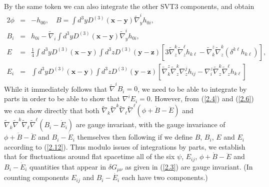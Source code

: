 By the same token we can also integrate the other SVT3 components, and obtain 
%
\begin{eqnarray}
2\phi&=&-h_{00},\quad
B=\int d^3yD^{(3)}(\mathbf{x}-\mathbf{y})\tilde{\nabla}_y^ih_{0i},
\nonumber\\
B_i&=&h_{0i}-\tilde{\nabla}_i\int d^3yD^{(3)}(\mathbf{x}-\mathbf{y})\tilde{\nabla}_y^ih_{0i},
\nonumber\\
E&=&\frac{1}{4}\int d^3yD^{(3)}(\mathbf{x}-\mathbf{y})\int d^3zD^{(3)}(\mathbf{y}-\mathbf{z})\left[3\tilde{\nabla}_z^k\tilde{\nabla}_z^{\ell}h_{k\ell}-\tilde{\nabla}^z_k\tilde{\nabla}_z^k(\delta^{k\ell}h_{k\ell})\right],
\nonumber\\
E_i&=&\int d^3yD^{(3)}(\mathbf{x}-\mathbf{y})\int d^3zD^{(3)}(\mathbf{y}-\mathbf{z})\left[\tilde{\nabla}^z_k\tilde{\nabla}_z^k\nabla_z^jh_{ij}-\nabla^z_i\tilde{\nabla}_z^k\tilde{\nabla}_z^{\ell}h_{k\ell}\right]
\label{2.12}
\end{eqnarray}
%
While it immediately follows that $\tilde{\nabla}^iB_i=0$,  we need to be able to integrate by parts in order to be able to show that $\nabla^iE_i=0$. However, from (\ref{2.4}) and (\ref{2.6}) we can show directly that both $\tilde{\nabla}_k\tilde{\nabla}^k\tilde{\nabla}_{\ell}\tilde{\nabla}^{\ell}(\phi+\dot{B}-\ddot{E})$ and $\tilde{\nabla}_k\tilde{\nabla}^k\tilde{\nabla}_{\ell}\tilde{\nabla}^{\ell}(B_i-\dot{E}_i)$ are gauge invariant, with the gauge invariance of $\phi+\dot{B}-\ddot{E}$ and $B_i-\dot{E}_i$ themselves then following if we define $B$, $B_i$, $E$ and $E_i$ according to (\ref{2.12}). Thus modulo issues of integrations by parts, we establish that for fluctuations around flat spacetime all of the six $\psi$, $E_{ij}$,  $\phi+\dot{B}-\ddot{E}$ and $B_i-\dot{E}_i$ quantities that appear in $\delta G_{\mu\nu}$ as given in (\ref{2.3}) are gauge invariant. (In counting components $E_{ij}$ and $B_i-\dot{E_i}$ each have two components.)

